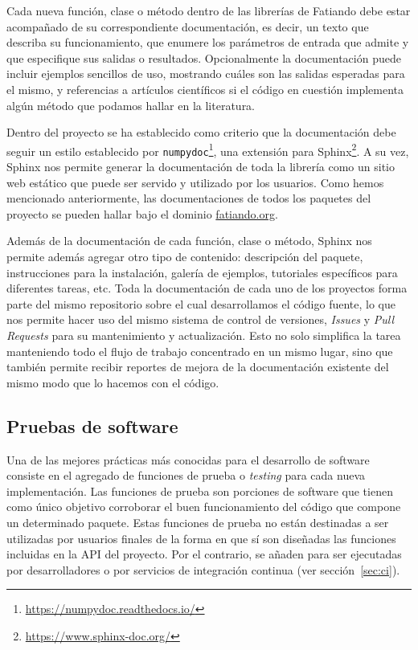 Cada nueva función, clase o método dentro de las librerías de Fatiando debe
estar acompañado de su correspondiente documentación, es decir, un texto que
describa su funcionamiento, que enumere los parámetros de entrada que admite
y que especifique sus salidas o resultados.
Opcionalmente la documentación puede incluir ejemplos sencillos de uso,
mostrando cuáles son las salidas esperadas para el mismo, y referencias
a artículos científicos si el código en cuestión implementa algún método que
podamos hallar en la literatura.

Dentro del proyecto se ha establecido como criterio que la documentación debe
seguir un estilo establecido por
\texttt{numpydoc}\footnote{\url{https://numpydoc.readthedocs.io/}},
una extensión para Sphinx\footnote{\url{https://www.sphinx-doc.org/}}.
A su vez, Sphinx nos permite generar la documentación de toda la librería como
un sitio web estático que puede ser servido y utilizado por los usuarios.
Como hemos mencionado anteriormente, las documentaciones de todos los paquetes
del proyecto se pueden hallar bajo el dominio
\href{https://www.fatiando.org}{fatiando.org}.

Además de la documentación de cada función, clase o método, Sphinx nos permite
además agregar otro tipo de contenido: descripción del paquete, instrucciones
para la instalación, galería de ejemplos, tutoriales específicos para
diferentes tareas, etc.
Toda la documentación de cada uno de los proyectos forma parte del mismo
repositorio sobre el cual desarrollamos el código fuente, lo que nos permite
hacer uso del mismo sistema de control de versiones, \emph{Issues} y \emph{Pull
Requests} para su mantenimiento y actualización.
Esto no solo simplifica la tarea manteniendo todo el flujo de trabajo
concentrado en un mismo lugar, sino que también permite recibir reportes de
mejora de la documentación existente del mismo modo que lo hacemos con el
código.

\subsection{Pruebas de software}

Una de las mejores prácticas más conocidas para el desarrollo de software
consiste en el agregado de funciones de prueba o \emph{testing} para cada nueva
implementación.
Las funciones de prueba son porciones de software que tienen como único
objetivo corroborar el buen funcionamiento del código que compone un
determinado paquete.
Estas funciones de prueba no están destinadas a ser utilizadas por usuarios
finales de la forma en que sí son diseñadas las funciones incluidas en la
\ac{API} del proyecto.
Por el contrario, se añaden para ser ejecutadas por desarrolladores o por
servicios de integración continua (ver sección~\ref{sec:ci}).

